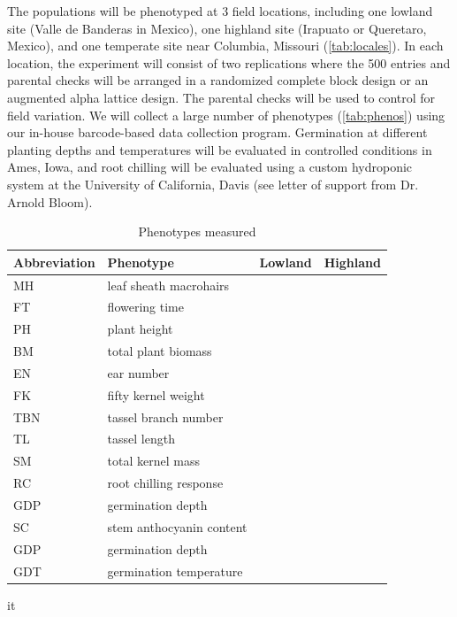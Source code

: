 The populations will be phenotyped at 3 field locations, including one lowland site (Valle de Banderas in Mexico), one highland site (Irapuato or Queretaro, Mexico), and one temperate site near Columbia, Missouri (\ref{tab:locales}).  In each location, the experiment will consist of two replications where the 500 entries and parental checks will be arranged in a randomized complete block design or an augmented alpha lattice design. The parental checks will be used to control for field variation.  We will collect a large number of phenotypes (\ref{tab:phenos}) using our in-house barcode-based data collection program. Germination at different planting depths and temperatures will be evaluated in controlled conditions in Ames, Iowa, and root chilling will be evaluated using a custom hydroponic system at the University of California, Davis (see letter of support from Dr. Arnold Bloom).    

\begin{table}
\begin{center}
\caption{Phenotypes measured}\label{phenos}
\begin{tabular}{llcc}\\\toprule  
{\bf Abbreviation} & {\bf Phenotype} & {\bf Lowland} & {\bf Highland } \\\midrule
MH & leaf sheath macrohairs & & \\
FT & flowering time & & \\
PH & plant height 			& & \\
BM & total plant biomass 	& & \\
EN & ear number			& & \\
FK & fifty kernel weight & & \\
TBN & tassel branch number & &\\
TL & tassel length & &\\
SM & total kernel mass & &\\
RC & root chilling response & &\\
GDP & germination depth & &\\
SC & stem anthocyanin content & &\\
GDP & germination depth & &\\
GDT & germination temperature & &\\\bottomrule
\end{tabular}
\end{center}it
\end{table} 

